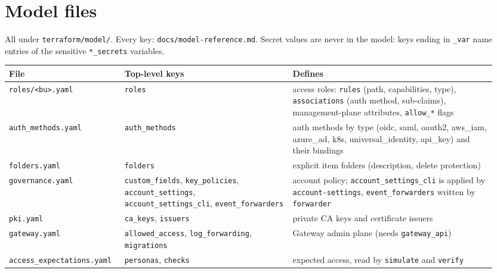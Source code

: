 \chapter{Model files}\label{app:model}
All under \texttt{terraform/model/}. Every key: \texttt{docs/model-reference.md}. Secret values are never
in the model: keys ending in \texttt{\_var} name entries of the sensitive \texttt{*\_secrets} variables.
{\small
\begin{longtable}{@{}>{\raggedright\arraybackslash}p{0.22\linewidth}>{\raggedright\arraybackslash}p{0.33\linewidth}>{\raggedright\arraybackslash}p{0.4\linewidth}@{}}
\toprule
\textbf{File} & \textbf{Top-level keys} & \textbf{Defines} \\ \midrule\endhead
\texttt{roles/<bu>.yaml} & \texttt{roles} & access roles: \texttt{rules} (path, capabilities, type), \texttt{associations} (auth method, sub-claims), management-plane attributes, \texttt{allow\_*} flags \\
\texttt{auth\_methods.yaml} & \texttt{auth\_methods} & auth methods by type (oidc, saml, oauth2, aws\_iam, azure\_ad, k8s, universal\_identity, api\_key) and their bindings \\
\texttt{folders.yaml} & \texttt{folders} & explicit item folders (description, delete protection) \\
\texttt{governance.yaml} & \texttt{custom\_fields}, \texttt{key\_policies}, \texttt{account\_settings}, \texttt{account\_settings\_cli}, \texttt{event\_forwarders} & account policy; \texttt{account\_settings\_cli} is applied by \texttt{account-settings}, \texttt{event\_forwarders} written by \texttt{forwarder} \\
\texttt{pki.yaml} & \texttt{ca\_keys}, \texttt{issuers} & private CA keys and certificate issuers \\
\texttt{gateway.yaml} & \texttt{allowed\_access}, \texttt{log\_forwarding}, \texttt{migrations} & Gateway admin plane (needs \texttt{gateway\_api}) \\
\texttt{access\_expectations.yaml} & \texttt{personas}, \texttt{checks} & expected access, read by \texttt{simulate} and \texttt{verify} \\
\bottomrule
\end{longtable}}

